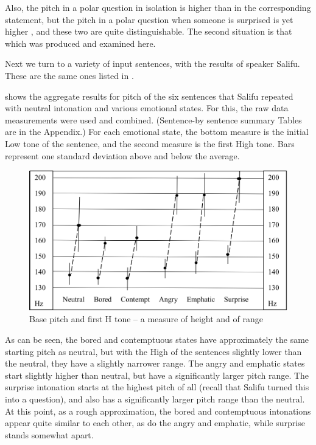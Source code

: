 \documentclass[output=paper]{langsci/langscibook}
\begin{document}
Also, the pitch in a polar question in isolation is higher than in the corresponding statement, but the pitch in a polar question when someone is surprised is yet higher \citep{cahill2012}, and these two are quite distinguishable. The second situation is that which was produced and examined here.


Next we turn to a variety of input sentences, with the results of speaker Salifu. These are the same ones listed in .


 shows the aggregate results for pitch of the six sentences that Salifu repeated with neutral intonation and various emotional states. For this, the raw data measurements were used and combined. (Sentence-by sentence summary Tables are in the Appendix.) For each emotional state, the bottom measure is the initial Low tone of the sentence, and the second measure is the first High tone. Bars represent one standard deviation above and below the average.


\begin{figure}[h]
\includegraphics[width=\textwidth]{figures/cahillfig2}
\caption{Base pitch and first H tone -- a measure of height and of range}
\label{fig:2.cahill}
\end{figure}
 
As can be seen, the bored and contemptuous states have approximately the same starting pitch as neutral, but with the High of the sentences slightly lower than the neutral, they have a slightly narrower range.  The angry and emphatic states start slightly higher than neutral, but have a significantly larger pitch range.  The surprise intonation starts at the highest pitch of all (recall that Salifu turned this into a question), and also has a significantly larger pitch range than the neutral. At this point, as a rough approximation, the bored and contemptuous intonations appear quite similar to each other, as do the angry and emphatic, while surprise stands somewhat apart. 
\end{document}
